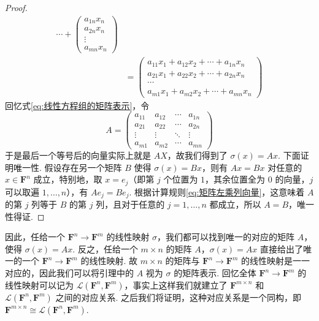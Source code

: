 \begin{proof}
\begin{align*}
        \cdots +
        \begin{pmatrix} a_{1n} x_n \\ a_{2n} x_n \\ \vdots \\ a_{mn} x_n \end{pmatrix} \\
        &= \begin{pmatrix}
            a_{11} x_1 + a_{12} x_2 + \cdots + a_{1n} x_n \\
            a_{21} x_1 + a_{22} x_2 + \cdots + a_{2n} x_n \\
            \cdots\\
            a_{m1} x_1 + a_{m2} x_2 + \cdots + a_{mn} x_n
        \end{pmatrix}
    \end{align*}
    回忆式\eqref{eq:线性方程组的矩阵表示}，令
    \[
        A = \begin{pmatrix}
            a_{11} & a_{12} & \cdots & a_{1n} \\
            a_{21} & a_{22} & \cdots & a_{2n} \\
            \vdots & \vdots & \ddots & \vdots \\
            a_{m1} & a_{m2} & \cdots & a_{mn}
        \end{pmatrix}
    \]
    于是最后一个等号后的向量实际上就是 $AX$，故我们得到了 $\sigma(x) = Ax$. 下面证明唯一性. 假设存在另一个矩阵 $B$ 使得 $\sigma(x) = Bx$，则有 $Ax = Bx$ 对任意的 $x \in \mathbf{F}^n$ 成立，特别地，取 $x = e_j$（即第 $j$ 个位置为 $1$，其余位置全为 $0$ 的向量，$j$ 可以取遍 $1,\ldots,n$），有 $Ae_j = Be_j$. 根据计算规则\autoref{eq:矩阵左乘列向量}，这意味着 $A$ 的第 $j$ 列等于 $B$ 的第 $j$ 列，且对于任意的 $j = 1,\ldots,n$ 都成立，所以 $A = B$，唯一性得证.
\end{proof}

因此，任给一个 $\mathbf{F}^n \to \mathbf{F}^m$ 的线性映射 $\sigma$，我们都可以找到唯一的对应的矩阵 $A$，使得 $\sigma(x) = Ax$. 反之，任给一个 $m \times n$ 的矩阵 $A$，$\sigma(x) = Ax$ 直接给出了唯一的一个 $\mathbf{F}^n \to \mathbf{F}^m$ 的线性映射. 故 $m \times n$ 的矩阵与 $\mathbf{F}^n \to \mathbf{F}^m$ 的线性映射是一一对应的，因此我们可以将引理中的 $A$ 视为 $\sigma$ 的矩阵表示. 回忆全体 $\mathbf{F}^n \to \mathbf{F}^m$ 的线性映射可以记为 $\mathcal{L}(\mathbf{F}^n, \mathbf{F}^m)$，事实上这样我们就建立了 $\mathbf{F}^{m\times n}$ 和 $\mathcal{L}(\mathbf{F}^n, \mathbf{F}^m)$ 之间的对应关系. 之后我们将证明，这种对应关系是一个同构，即 $\mathbf{F}^{m \times n} \cong \mathcal{L}(\mathbf{F}^n, \mathbf{F}^m)$.

